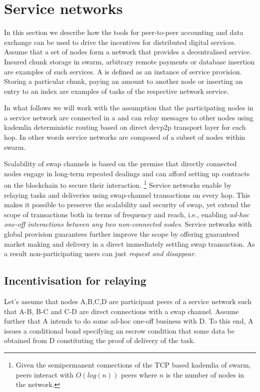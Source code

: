 \section{Service networks}
\label{sec:networks}

In this section we describe how the tools for peer-to-peer accounting and data exchange can
be used to drive the incentives for distributed digital services.
Assume that a set of nodes form a network that provides a decentralised service.
Insured chunk storage in swarm, arbitrary remote payments or database insertion are examples of such services.
A  is defined as an instance of service provision. Storing a particular chunk, paying
an amount to another node or inserting an entry to an index are examples of tasks of the respective network
service.

In what follows we will work with the assumption that the participating nodes in a service network are
connected in a  and can relay messages to other nodes using kademlia deterministic routing
based on direct devp2p transport layer for each hop. In other words service networks are composed of a subset
of nodes within swarm.

Scalability of
swap channels is based on the premise that directly connected nodes engage in long-term repeated
dealings and can afford setting up contracts on the blockchain to secure their interaction.%
%
\footnote{Given the semipermanent connections of the TCP based kademlia of swarm, peers interact with
$O(log(n))$ peers where $n$ is the number of nodes in the network.}
%
Service networks enable  by relaying tasks and deliveries using
swap-channel transactions on every hop.
This makes it possible to preserve the scalability and security
of swap, yet extend the scope of transactions both in terms of
frequency and reach, i.e., enabling \emph{ad-hoc one-off interactions between any two non-connected nodes}.
Service networks with global provision guarantees further improve the scope by
offering guaranteed market making and delivery in a direct immediately settling
swap transaction. As a result non-participating users can just \emph{request and disappear}.

\subsection{Incentivisation for relaying}

Let's assume that nodes A,B,C,D are participant peers of a service network such that
A-B, B-C and C-D are direct connections with a swap channel.
Assume further that A intends to do some ad-hoc one-off business with D. To this end,
 A issues a conditional bond specifying an escrow
condition that some data be obtained from D constituting the proof of delivery of the task.

